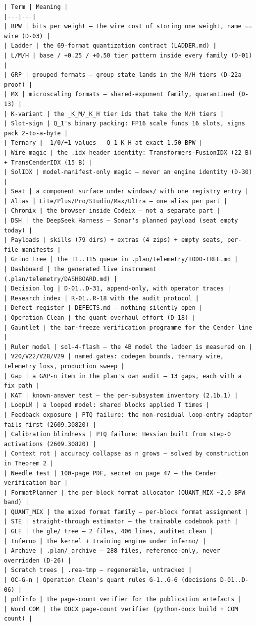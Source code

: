 \begin{Verbatim}[breaklines,breakanywhere,fontsize=\footnotesize]
| Term | Meaning |
|---|---|
| BPW | bits per weight — the wire cost of storing one weight, name == wire (D-03) |
| Ladder | the 69-format quantization contract (LADDER.md) |
| L/M/H | base / +0.25 / +0.50 tier pattern inside every family (D-01) |
| GRP | grouped formats — group state lands in the M/H tiers (D-22a proof) |
| MX | microscaling formats — shared-exponent family, quarantined (D-13) |
| K-variant | the _K_M/_K_H tier ids that take the M/H tiers |
| Slot-sign | Q_1's binary packing: FP16 scale funds 16 slots, signs pack 2-to-a-byte |
| Ternary | -1/0/+1 values — Q_1_K_H at exact 1.50 BPW |
| Wire magic | the .idx header identity: Transformers-FusionIDX (22 B) + TransCenderIDX (15 B) |
| SolIDX | model-manifest-only magic — never an engine identity (D-30) |
| Seat | a component surface under windows/ with one registry entry |
| Alias | Lite/Plus/Pro/Studio/Max/Ultra — one alias per part |
| Chromix | the browser inside Codeix — not a separate part |
| DSH | the DeepSeek Harness — Sonar's planned payload (seat empty today) |
| Payloads | skills (79 dirs) + extras (4 zips) + empty seats, per-file manifests |
| Grind tree | the T1..T15 queue in .plan/telemetry/TODO-TREE.md |
| Dashboard | the generated live instrument (.plan/telemetry/DASHBOARD.md) |
| Decision log | D-01..D-31, append-only, with operator traces |
| Research index | R-01..R-18 with the audit protocol |
| Defect register | DEFECTS.md — nothing silently open |
| Operation Clean | the quant overhaul effort (D-18) |
| Gauntlet | the bar-freeze verification programme for the Cender line |
| Ruler model | sol-4-flash — the 4B model the ladder is measured on |
| V20/V22/V28/V29 | named gates: codegen bounds, ternary wire, telemetry loss, production sweep |
| Gap | a GAP-n item in the plan's own audit — 13 gaps, each with a fix path |
| KAT | known-answer test — the per-subsystem inventory (2.1b.1) |
| LoopLM | a looped model: shared blocks applied T times |
| Feedback exposure | PTQ failure: the non-residual loop-entry adapter fails first (2609.30820) |
| Calibration blindness | PTQ failure: Hessian built from step-0 activations (2609.30820) |
| Context rot | accuracy collapse as n grows — solved by construction in Theorem 2 |
| Needle test | 100-page PDF, secret on page 47 — the Cender verification bar |
| FormatPlanner | the per-block format allocator (QUANT_MIX ~2.0 BPW band) |
| QUANT_MIX | the mixed format family — per-block format assignment |
| STE | straight-through estimator — the trainable codebook path |
| GLE | the gle/ tree — 2 files, 406 lines, audited clean |
| Inferno | the kernel + training engine under inferno/ |
| Archive | .plan/_archive — 288 files, reference-only, never overridden (D-26) |
| Scratch trees | .rea-tmp — regenerable, untracked |
| OC-G-n | Operation Clean's quant rules G-1..G-6 (decisions D-01..D-06) |
| pdfinfo | the page-count verifier for the publication artefacts |
| Word COM | the DOCX page-count verifier (python-docx build + COM count) |


\end{Verbatim}
